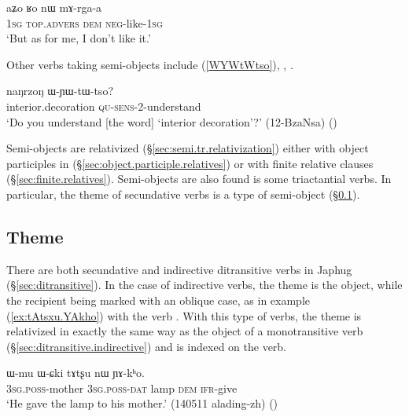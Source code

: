\begin{exe}
\ex \label{ex:aZo.Ro.nW.mArgaa}
\gll aʑo ʁo nɯ mɤ-rga-a \\
\textsc{1sg}  \textsc{top}.\textsc{advers} \textsc{dem} \textsc{neg}-like-\textsc{1sg} \\
\glt `But as for me, I don't like it.' 
\end{exe}

Other verbs taking semi-objects include  (\ref{WYWtWtso}), , .

\begin{exe}
\ex \label{WYWtWtso}
 \gll naŋrzoŋ ɯ-ɲɯ-tɯ-tso? \\
interior.decoration \textsc{qu}-\textsc{sens}-2-understand \\
\glt `Do you understand [the word] `interior decoration'?' (12-BzaNsa) ()
\end{exe}

Semi-objects are relativized (§\ref{sec:semi.tr.relativization}) either with object participles in  (§\ref{sec:object.participle.relatives}) or with finite relative clauses (§\ref{sec:finite.relatives}). Semi-objects are also found is some triactantial verbs. In particular, the theme of secundative verbs is a type of semi-object (§\ref{sec:theme.ditransitive}).

\subsection{Theme}  \label{sec:theme.ditransitive}
There are both secundative and indirective ditransitive verbs in Japhug (§\ref{sec:ditransitive}). In the case of indirective verbs, the theme is the object, while the recipient being marked with an oblique case, as in example (\ref{ex:tAtsxu.YAkho}) with the verb  . With this type of verbs, the theme is relativized in exactly the same way as the object of a monotransitive verb (§\ref{sec:ditransitive.indirective}) and is indexed on the verb.

\begin{exe}
\ex \label{ex:tAtsxu.YAkho} 
\gll ɯ-mu ɯ-ɕki tɤtʂu nɯ ɲɤ-kʰo. \\
\textsc{3sg}.\textsc{poss}-mother \textsc{3sg}.\textsc{poss}-\textsc{dat} lamp \textsc{dem}  \textsc{ifr}-give \\
 \glt `He gave the lamp to his mother.' (140511 alading-zh)
()
\end{exe}

